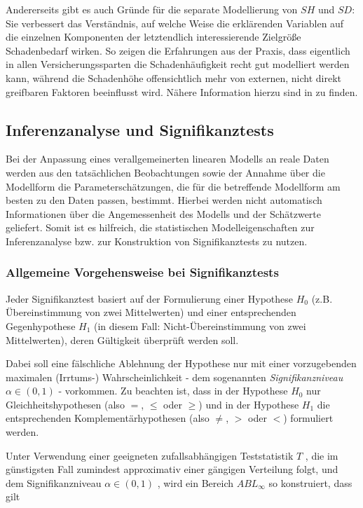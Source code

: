Andererseits gibt es auch Gründe für die separate Modellierung von $SH$  und $SD$: Sie verbessert das Verständnis, auf welche Weise die erklärenden Variablen auf die einzelnen Komponenten der letztendlich interessierende Zielgröße Schadenbedarf wirken. So zeigen die Erfahrungen aus der Praxis, dass eigentlich in allen Versicherungssparten die Schadenhäufigkeit recht gut modelliert werden kann, während die Schadenhöhe offensichtlich mehr von externen, nicht direkt greifbaren Faktoren beeinflusst wird. Nähere Information hierzu sind in \cite{Anderson} zu finden.


\subsection{Inferenzanalyse und Signifikanztests}\label{Inferenzanalyse}

Bei der Anpassung eines verallgemeinerten linearen Modells an reale Daten werden aus den tatsächlichen Beobachtungen sowie der Annahme über die Modellform die Parameterschätzungen, die für die betreffende Modellform am besten zu den Daten passen, bestimmt. Hierbei werden nicht automatisch Informationen über die Angemessenheit des Modells und der Schätzwerte geliefert. Somit ist es hilfreich, die statistischen Modelleigenschaften zur Inferenzanalyse bzw. zur Konstruktion von Signifikanztests zu nutzen.

\subsubsection{Allgemeine Vorgehensweise bei Signifikanztests}

Jeder Signifikanztest basiert auf der Formulierung einer Hypothese $H_0$  (z.B. Übereinstimmung von zwei Mittelwerten) und einer entsprechenden Gegenhypothese  $H_1$ (in diesem Fall: Nicht-Übereinstimmung von zwei Mittelwerten), deren Gültigkeit überprüft werden soll. 

Dabei soll eine fälschliche Ablehnung der Hypothese nur mit einer vorzugebenden maximalen (Irrtums-) Wahrscheinlichkeit - dem sogenannten \textit{Signifikanzniveau} $\alpha \in (0,1)$ - vorkommen. Zu beachten ist, dass in der Hypothese $H_0$  nur Gleichheitshypothesen (also $=$, $\leq$ oder $\geq$) und in der Hypothese $H_1$  die entsprechenden Komplementärhypothesen (also $\neq$, $>$ oder $<$) formuliert werden.

Unter Verwendung einer geeigneten zufallsabhängigen Teststatistik $T$ , die im günstigsten Fall zumindest approximativ einer gängigen Verteilung folgt, und dem Signifikanzniveau $\alpha \in (0,1)$ , wird ein Bereich $ABL_\infty$ so konstruiert, dass gilt


